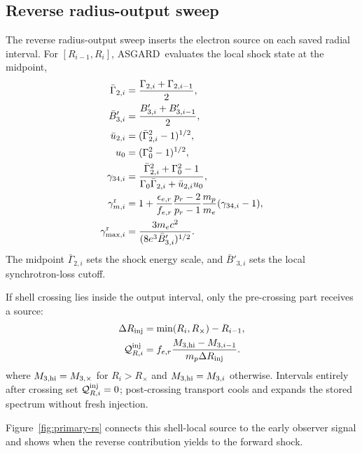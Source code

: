 \documentclass[twocolumn]{aastex702}
\newcommand{\asgard}{\textsc{ASGARD}}
\begin{document}
\subsection{Reverse radius-output sweep}

The reverse radius-output sweep inserts the electron source on each saved radial
interval.  For \([R_{i-1},R_i]\), \asgard\ evaluates the local shock state at the
midpoint,
\begin{equation}
\begin{aligned}
\bar\Gamma_{2,i}&=\frac{\Gamma_{2,i}+\Gamma_{2,i-1}}{2},\\
\bar B'_{3,i}&=\frac{B'_{3,i}+B'_{3,i-1}}{2},\\
\bar u_{2,i}&=(\bar\Gamma_{2,i}^2-1)^{1/2},\\
u_0&=(\Gamma_0^2-1)^{1/2},\\
\gamma_{34,i}
&=\frac{\bar\Gamma_{2,i}^2+\Gamma_0^2-1}
{\Gamma_0\bar\Gamma_{2,i}+\bar u_{2,i}u_0},\\
\gamma_{m,i}^{\rm r}&=
1+\frac{\epsilon_{e,r}}{f_{e,r}}
\frac{p_r-2}{p_r-1}
\frac{m_p}{m_e}(\gamma_{34,i}-1),\\
\gamma_{\max,i}^{\rm r}
&=\frac{3m_ec^2}{(8e^3\bar B'_{3,i})^{1/2}}.
\end{aligned}
\end{equation}
The midpoint \(\bar\Gamma_{2,i}\) sets the shock energy scale, and
\(\bar B'_{3,i}\) sets the local synchrotron-loss cutoff.

If shell crossing lies inside the output interval, only the pre-crossing part
receives a source:
\begin{equation}
\begin{aligned}
\Delta R_{\rm inj}&=\min(R_i,R_\times)-R_{i-1},\\
\mathcal Q^{\rm inj}_{R,i}
&=f_{e,r}\frac{M_{3,{\rm hi}}-M_{3,i-1}}
{m_p\Delta R_{\rm inj}}.
\end{aligned}
\end{equation}
where \(M_{3,{\rm hi}}=M_{3,\times}\) for \(R_i>R_\times\) and
\(M_{3,{\rm hi}}=M_{3,i}\) otherwise.  Intervals entirely after crossing set
\(\mathcal Q^{\rm inj}_{R,i}=0\); post-crossing transport cools and expands the
stored spectrum without fresh injection.

Figure~\ref{fig:primary-rs} connects this shell-local source to the early
observer signal and shows when the reverse contribution yields to the forward
shock.
\end{document}
